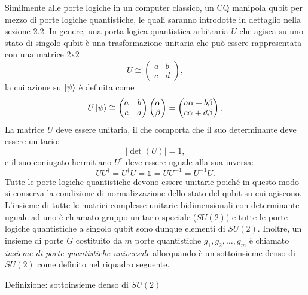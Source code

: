 Similmente alle porte logiche in un computer classico, un \ac{CQ} manipola qubit per mezzo di porte 
logiche quantistiche, le quali saranno introdotte in dettaglio nella sezione 2.2. In genere, 
una porta logica quantistica arbitraria $U$ che agisca su uno stato di singolo qubit è una 
trasformazione unitaria che può essere rappresentata con una matrice 2x2
\begin{equation} \label{eq:2.14}
    U \cong 
    \begin{pmatrix}
        a & b \\ c & d
    \end{pmatrix},
\end{equation}
la cui azione su $\ket{\psi}$ è definita come 
\begin{equation}
    U\ket{\psi} \cong \begin{pmatrix}
        a&b\\c&d
    \end{pmatrix}\begin{pmatrix}
        \alpha\\\beta
    \end{pmatrix} = \begin{pmatrix}
        a\alpha + b\beta \\ c\alpha + d\beta
    \end{pmatrix}.
\end{equation}
La matrice $U$ deve essere unitaria, il che comporta che il suo determinante deve essere unitario: 
\begin{equation}
    |\det(U)|=1,
\end{equation}
e il suo coniugato hermitiano $U^\dagger$ deve essere uguale alla sua inversa: 
\begin{equation}
    UU^\dagger = U^\dagger U = \mathbb{1} = UU^{-1} = U^{-1}U.
\end{equation}
Tutte le porte logiche quantistiche devono essere unitarie poiché in questo modo si conserva 
la condizione di normalizzazione dello stato del qubit su cui agiscono. L'insieme di tutte 
le matrici complesse unitarie bidimensionali con determinante uguale ad uno è chiamato gruppo 
unitario speciale ($SU(2)$) e tutte le porte logiche quantistiche a singolo qubit sono dunque 
elementi di $SU(2)$. Inoltre, un insieme di porte $G$ costituito da $m$ porte quantistiche 
$g_1, g_2, \ldots, g_m$ è chiamato \emph{insieme di porte quantistiche universale} allorquando 
è un sottoinsieme denso di $SU(2)$ come definito nel riquadro seguente.

Definizione: sottoinsieme denso di $SU(2)$

